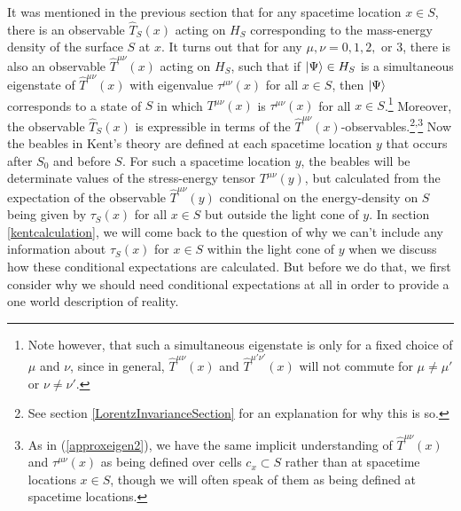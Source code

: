 It was mentioned in the previous section that for any spacetime location $x\in S$,  there is an observable $\hat{T}_S(x)$ acting on $H_S$ corresponding to the mass-energy density of the surface $S$ at $x$. It turns out that for any $\mu, \nu=0,1,2,$ or $3$, there is also an observable  $\hat{T}^{\mu\nu}(x)$ acting on $H_S$, such that if $\ket{\Psi}\in H_S$ is a simultaneous eigenstate of $\hat{T}^{\mu\nu}(x)$ with eigenvalue $\tau^{\mu\nu}(x)$ for all $x\in S$, then $\ket{\Psi}$ corresponds to a state of $S$ in which $T^{\mu\nu}(x)$ is  $\tau^{\mu\nu}(x)$ for all $x\in S$.\footnote{Note however, that such a simultaneous eigenstate is only for a fixed choice of $\mu$ and $\nu$, since in general, $\hat{T}^{\mu\nu}(x)$ and $\hat{T}^{\mu'\nu'}(x)$ will not commute for $\mu\neq\mu'$ or $\nu\neq\nu'$. } Moreover, the observable $\hat{T}_S(x)$ is expressible in terms of the  $\hat{T}^{\mu\nu}(x)$-observables.\footnote{See section  \ref{LorentzInvarianceSection} for an explanation for why this is so.}\textsuperscript{,}\footnote{As in (\ref{approxeigen2}), we have the same implicit understanding of $\hat{T}^{\mu\nu}(x)$ and $\tau^{\mu\nu}(x)$ as being defined over cells $c_x\subset S$ rather than at spacetime locations $x\in S$, though we will often speak of them as being defined at spacetime locations. }
Now the  beables in Kent's theory are defined at each spacetime location $y$ that occurs after $S_0$ and before $S$. For such a spacetime location $y$, the beables will be determinate values of the stress-energy tensor $T^{\mu\nu}(y)$, but calculated from the expectation of the observable $\hat{T}^{\mu\nu}(y)$ conditional on the energy-density on $S$ being given by $\tau_S(x)$ for all $x\in S$ but outside the light cone of $y$. In section \ref{kentcalculation}, we will come back to the question of why we can't include any information about $\tau_S(x)$ for $x\in S$ within the light cone of $y$ when we discuss how these conditional expectations are calculated. But before we do that, we first consider why we should need conditional expectations at all in order to provide a one world description of reality.


